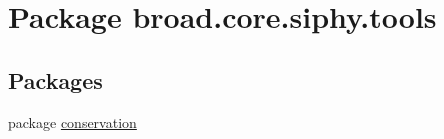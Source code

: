 \hypertarget{namespacebroad_1_1core_1_1siphy_1_1tools}{\section{Package broad.\+core.\+siphy.\+tools}
\label{namespacebroad_1_1core_1_1siphy_1_1tools}
}
\subsection*{Packages}
\begin{DoxyCompactItemize}
\item 
package \hyperlink{namespacebroad_1_1core_1_1siphy_1_1tools_1_1conservation}{conservation}
\end{DoxyCompactItemize}
